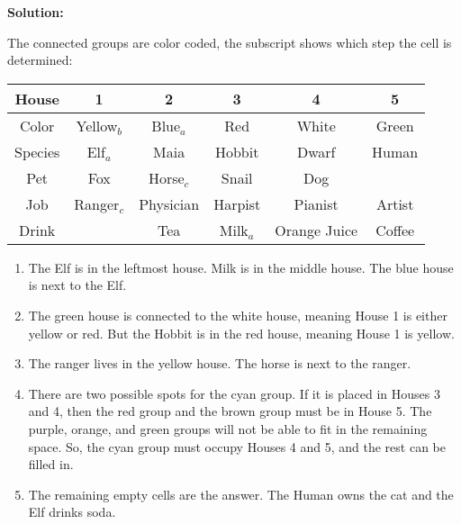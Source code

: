 \documentclass{article}
\newenvironment{solution}
{
\medskip
\par
\color{blue}
\textbf{Solution:}
}
{
\medskip
\par
}
\begin{document}
\begin{enumerate}
    \begin{solution}
        The connected groups are color coded, the subscript shows which step the cell is determined:
        \begin{center}
            \begin{tabular}{|c|c|c|c|c|c|} 
                 \hline
                 House & 1 & 2 & 3 & 4 & 5 \\
                 \hline
                 Color & Yellow$_b$ & Blue$_a$ &\color{red}Red &\color{cyan}White & \color{cyan}Green\\
                 \hline
                 Species & Elf$_a$ & \color{magenta}Maia &\color{red}Hobbit &\color{orange}Dwarf & \color{teal}Human\\
                 \hline
                 Pet & \color{olive}Fox& Horse$_c$ & \color{violet}Snail &\color{orange}Dog &\\
                 \hline
                 Job & Ranger$_c$ & \color{olive}Physician& \color{violet}Harpist &\color{brown} Pianist &\color{teal}Artist\\
                 \hline
                 Drink & & \color{magenta}Tea & Milk$_a$ &\color{brown}Orange Juice & \color{cyan}Coffee \\
                 \hline
            \end{tabular}
        \end{center}
        \begin{enumerate}
            \item The Elf is in the leftmost house. Milk is in the middle house. The blue house is next to the Elf.
            \item The green house is connected to the white house, meaning House 1 is either yellow or red. But the Hobbit is in the red house, meaning House 1 is yellow.
            \item The ranger lives in the yellow house. The horse is next to the ranger.
            \item There are two possible spots for the cyan group. If it is placed in Houses 3 and 4, then the red group and the brown group must be in House 5. The purple, orange, and green groups will not be able to fit in the remaining space. So, the cyan group must occupy Houses 4 and 5, and the rest can be filled in.
            \item The remaining empty cells are the answer. The Human owns the cat and the Elf drinks soda.
        \end{enumerate}
    \end{solution}


\end{enumerate}
\end{document}
